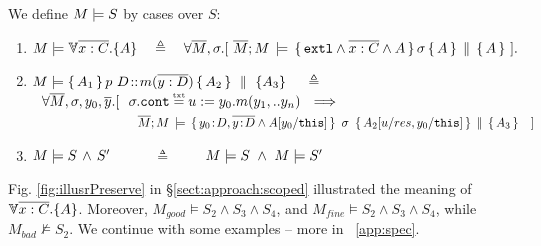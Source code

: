 \begin{definition}  
We define $M \models {S}$ by cases over $S$:  

\label{def:necessity-semantics}

\begin{enumerate}
 \item
\label{def:necessity-semantics-first}
 $\satisfies{M}{\TwoStatesN {\overline {x:C}} {A}} \ \  \ \triangleq   \ \ \ {\forall   \Mtwo,  \sigma.[\ {\satAssertQuadruple  \Mtwo  M    {\extThis \wedge \overline {x:C} \wedge A} \sigma {A} {A} }\ ].}$
  \item
   \label{def:necessity-semantics-second}
 $M \models   \{\, A_1\, \}\, p\ D\!::\!m(\overline{y:D})\, \{\, A_2\, \} \, \,\parallel\,\, \{ A_3 \}\  \ \ \   \triangleq  $ \\ %
$\strut \ \   \forall   \Mtwo,  \sigma, y_0,\overline y.[\ 
 \ \sigma.\prg{cont}\txteq {u:=y_0.m(y_1,..y_n)} \ \ \Longrightarrow \ \ $\\
$\strut  \ \ \   \ \ \ \ \ \ \ \ \   \ \ \  \ \ 
\ \ \ \ \ \ \ \ \ {\satAssertQuadruple  { \Mtwo} {M} { y_0\!:\!D, \overline {y\!:\!D}   \wedge   A[y_0/\prg{this}]}  {\ \sigma\ }   {A_2[u/res,y_0/\prg{this}] }{A_3 } } \  \ \  ]  $   
 \item
 $M \models S\, \wedge\, S'$\ \ \  \ \ \  $\triangleq$  \  \ \  \   $M \models S\ \wedge \ M \models S'$
\end{enumerate}
\end{definition}

Fig. \ref{fig:illusrPreserve} in  \S \ref{sect:approach:scoped}  illustrated  the meaning of ${\TwoStatesN {\overline {x:C}} {A}}$. 
Moreover, $M_{good} \models S_2 \wedge S_3 \wedge S_4$, and  $M_{fine} \models S_2 \wedge S_3 \wedge S_4$,
 while $M_{bad} \not\models S_2$.
We continue with some examples -- more in %
\A ~\ref{app:spec}.

